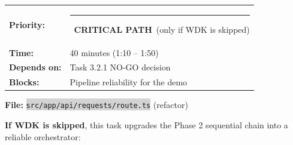 \documentclass[11pt, a4paper]{article}
\newcommand{\critical}{\textcolor{critred}{\rule{6pt}{6pt}}~\textcolor{critred}{\scriptsize\textbf{CRITICAL PATH}}}
\newcommand{\code}[1]{\texttt{\small\colorbox{lightgray}{#1}}}
\begin{document}
\begin{tabularx}{\textwidth}{lX}
\textbf{Priority:} & \critical~(only if WDK is skipped) \\
\textbf{Time:} & 40 minutes (1:10 -- 1:50) \\
\textbf{Depends on:} & Task 3.2.1 NO-GO decision \\
\textbf{Blocks:} & Pipeline reliability for the demo \\
\end{tabularx}

\vspace{0.3em}

\textbf{File:} \code{src/app/api/requests/route.ts} (refactor)

\textbf{If WDK is skipped}, this task upgrades the Phase 2 sequential chain into a reliable orchestrator:
\end{document}
